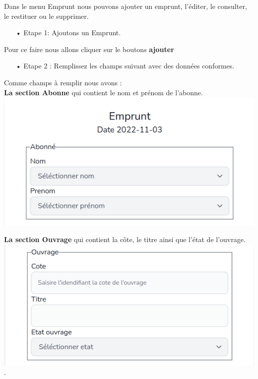 \documentclass[12pt,a4paper]{article}
\begin{document}
Dans le menu Emprunt nous pouvons ajouter un emprunt, l'éditer, le consulter, le restituer ou le supprimer.

\begin{itemize}
\item[•]Etape 1: Ajoutons un Emprunt.
\end{itemize}

Pour ce faire nous allons cliquer sur le boutons \textbf{ajouter} 

\begin{itemize}
\item[•]Etape 2 : Remplissez les champs suivant avec des données conformes.
\end{itemize}

Comme champs à remplir nous avons :\\
\textbf{La section Abonne} qui contient le nom et prénom de l'abonne.\\

\includegraphics[scale=0.5]{images/Abonne.png}

\textbf{La section Ouvrage} qui contient la côte, le titre ainsi que l'état de l'ouvrage.\\

\includegraphics[scale=0.5]{images/EOuvrage.png}.\\
\end{document}
